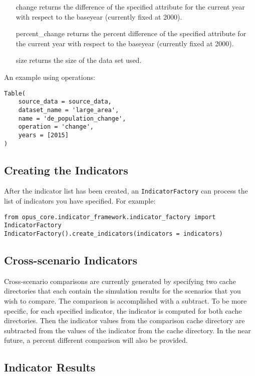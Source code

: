 \begin{itemize}
\tight
  \item[change] returns the difference of the specified
  attribute for the current year with respect to the baseyear (currently fixed
  at 2000).
  \item[percent_change] returns the percent difference of the specified
  attribute for the current year with respect to the baseyear (currently fixed
  at 2000). 
  \item[size] returns the size of the data set used.
\end{itemize}

An example using operations:
\begin{verbatim}
Table(
    source_data = source_data,
    dataset_name = 'large_area',
    name = 'de_population_change',
    operation = 'change',
	years = [2015]
)
\end{verbatim}

\subsection{Creating the Indicators}
After the indicator list has been created, an
\verb|IndicatorFactory| can process the list of indicators you have specified. 
For example:

\begin{verbatim}
from opus_core.indicator_framework.indicator_factory import IndicatorFactory
IndicatorFactory().create_indicators(indicators = indicators)
\end{verbatim}

\subsection{Cross-scenario Indicators}
\label{sec:indicator-cross-scenario}

Cross-scenario comparisons are currently generated by specifying two 
cache directories that each contain the simulation results for the 
scenarios that you wish to compare. The comparison is 
accomplished with a subtract. To be more specific, for each specified 
indicator, the indicator is computed for both cache directories. Then
the indicator values from the comparison cache directory are subtracted
from the values of the indicator from the cache directory. 
In the near future, a percent different comparison will also be provided.

\subsection{Indicator Results}
\label{sec:indicator-results}

